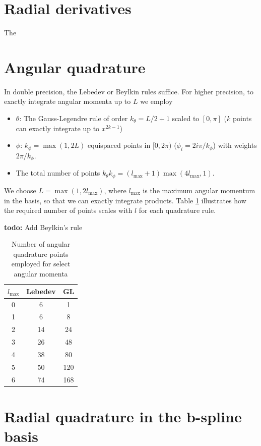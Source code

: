 \documentclass[12pt]{article}
\begin{document}
\section{Radial derivatives}

The 

\section{Angular quadrature}
In double precision, the Lebedev or Beylkin rules suffice.  For higher precision, to exactly integrate angular momenta up to $L$  we employ
\begin{itemize}
\item $\theta$: The Gauss-Legendre rule of order $k_\theta = L/2 + 1$ scaled to $[0,\pi]$ ($k$ points can exactly integrate up to $x^{2k-1}$)
\item $\phi$: $k_\phi = \max(1,2 L)$ equispaced points in $[0,2 \pi)$ ($\phi_i = 2 i \pi / k_\phi$) with weights $2 \pi / k_\phi$.
 \item The total number of points $k_\theta k_\phi = (l_{\mbox{max}} + 1) \max(4 l_{\mbox{max}},1) $.
\end{itemize}
We choose $L = \max(1, 2 l_{\mbox{max}})$, where $l_{\mbox{max}}$ is the maximum angular momentum in the basis, so that we can exactly integrate products.  Table \ref{tab:GLnpts} illustrates how the required number of points scales with $l$ for each quadrature rule.

{\bf todo:} Add Beylkin's rule 

\begin{table}
  \begin{center}
  \caption{Number of angular quadrature points employed for select angular momenta} \label{tab:GLnpts}
  \begin{tabular}{ccc}
    $l_{\mbox{max}}$ & Lebedev & GL  \\ \hline
    0 & 6 & 1 \\
    1 & 6 & 8 \\
    2 & 14 & 24 \\
    3 & 26 & 48 \\
    4 & 38 & 80 \\
    5 & 50 & 120 \\
    6 & 74 & 168 \\ \hline
  \end{tabular}
  \end{center}
\end{table}

\section{Radial quadrature in the b-spline basis}
\end{document}
